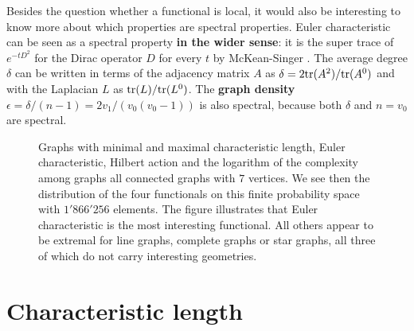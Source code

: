\documentclass[12pt]{amsart}
\theoremstyle{definition}
\begin{document}
Besides the question whether a functional is local,
it would also be interesting to know more about which properties are spectral properties. 
Euler characteristic can be seen as a spectral property {\bf in the wider sense}:  
it is the super trace of $e^{-t D^2}$ for the Dirac operator $D$ for every $t$ by 
McKean-Singer \cite{knillmckeansinger}. 
The average degree $\delta$ can be written in terms of the adjacency matrix $A$ as 
$\delta = 2 {\rm tr}(A^2)/{\rm tr}(A^0)$ and
with the Laplacian $L$ as ${\rm tr}(L)/{\rm tr}(L^0)$. The {\bf graph density}
$\epsilon=\delta/(n-1) = 2 v_1/(v_0(v_0-1))$ is also spectral, because both $\delta$ and $n=v_0$ are spectral.

\begin{figure}
\parbox{15.4cm}{
\parbox{15cm}{}
\parbox{15cm}{}
\parbox{15cm}{}
}
\caption{
Graphs with minimal and maximal characteristic length, 
Euler characteristic, Hilbert action and the logarithm of the complexity among graphs all
connected graphs with $7$ vertices. We see then the distribution of the four functionals
on this finite probability space with $1'866'256$ elements. The figure illustrates that
Euler characteristic is the most interesting functional. All others appear to be extremal for
line graphs, complete graphs or star graphs, all three of which do not carry 
interesting geometries. 
}
\label{extrema}
\end{figure}

\section{Characteristic length}
\end{document}
